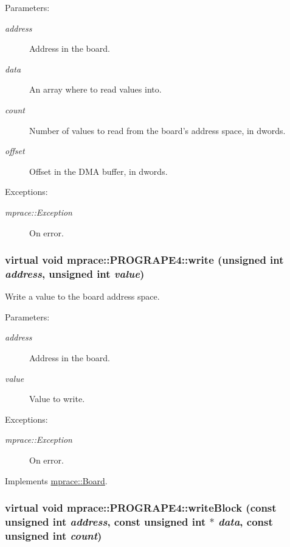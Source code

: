 \begin{Desc}
\item[Parameters:]
\begin{description}
\item[{\em address}]Address in the board. \item[{\em data}]An array where to read values into. \item[{\em count}]Number of values to read from the board's address space, in dwords. \item[{\em offset}]Offset in the DMA buffer, in dwords. \end{description}
\end{Desc}
\begin{Desc}
\item[Exceptions:]
\begin{description}
\item[{\em mprace::Exception}]On error.\end{description}
\end{Desc}
\hypertarget{classmprace_1_1PROGRAPE4_a2}{
\subsubsection[write]{\setlength{\rightskip}{0pt plus 5cm}virtual void mprace::PROGRAPE4::write (unsigned int {\em address}, unsigned int {\em value})}}
\label{classmprace_1_1PROGRAPE4_a2}


Write a value to the board address space. 

\begin{Desc}
\item[Parameters:]
\begin{description}
\item[{\em address}]Address in the board. \item[{\em value}]Value to write. \end{description}
\end{Desc}
\begin{Desc}
\item[Exceptions:]
\begin{description}
\item[{\em mprace::Exception}]On error.\end{description}
\end{Desc}


Implements \hyperlink{classmprace_1_1Board_a3}{mprace::Board}.\hypertarget{classmprace_1_1PROGRAPE4_a4}{
\subsubsection[writeBlock]{\setlength{\rightskip}{0pt plus 5cm}virtual void mprace::PROGRAPE4::write\-Block (const unsigned int {\em address}, const unsigned int $\ast$ {\em data}, const unsigned int {\em count})}}
\label{classmprace_1_1PROGRAPE4_a4}


